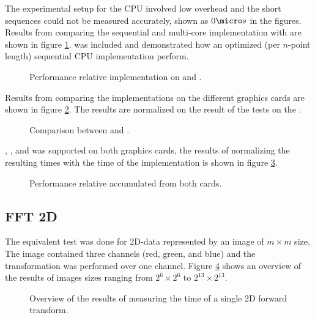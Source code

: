 The experimental setup for the CPU involved low overhead and the short sequences could not be measured accurately, shown as $0{\micro}s$ in the figures. Results from comparing the sequential {\CPP} and multi-core {\OMP} implementation with {\CU} are shown in figure \ref{fig:gtx:cpu}. {\FFTW} was included and demonstrated how an optimized (per $n$-point length) sequential CPU implementation perform.

\begin{figure}
	\centering
	
	\caption{Performance relative {\CU} implementation on {\NVCARD} and {\INTELCPU}.}
	\label{fig:gtx:cpu}
\end{figure}

Results from comparing the implementations on the different graphics cards are shown in figure \ref{fig:gpu-comparison}. The results are normalized on the result of the tests on the {\NVCARD}.

\begin{figure}
	\centering
	
	\caption{Comparison between {\AMDCARD} and {\NVCARD}.}
	\label{fig:gpu-comparison}
\end{figure}

{\DX}, {\GL}, and {\OCL} was supported on both graphics cards, the results of normalizing the resulting times with the time of the {\OCL} implementation is shown in figure \ref{fig:gpu-comparison-tech}.

\begin{figure}
	\centering
	
	\caption{Performance relative {\OCL} accumulated from both cards.}
	\label{fig:gpu-comparison-tech}
\end{figure}


\newpage

\subsection{FFT 2D}

The equivalent test was done for \gls{2D}-data represented by an image of $m{\times}m$ size. The image contained three channels (red, green, and blue) and the transformation was performed over one channel. Figure \ref{fig:gpu:overview-2d} shows an overview of the results of images sizes ranging from $2^{6}{\times}2^{6}$ to $2^{13}{\times}2^{13}$.

\begin{figure}
	\centering
	\subfloat[\NVCARD]{	
		
	}
	\vfill
	\subfloat[\AMDCARD]{
		
	}
	\caption{Overview of the results of measuring the time of a single 2D forward transform.}
	\label{fig:gpu:overview-2d}
\end{figure}

